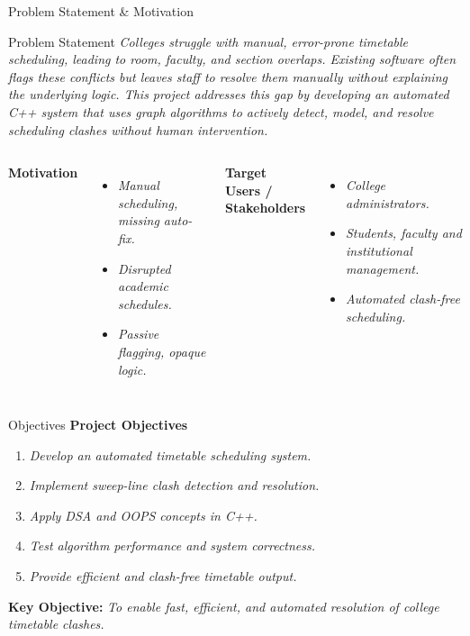 \documentclass[aspectratio=169,11pt]{beamer}
\newcommand{\placeholder}[1]{\textit{\color{GEUGrey}#1}}
\begin{document}
\begin{frame}{Problem Statement \& Motivation}
\begin{block}{Problem Statement}
\placeholder{Colleges struggle with manual, error-prone timetable scheduling, leading to room, faculty, and section overlaps. Existing software often flags these conflicts but leaves staff to resolve them manually without explaining the underlying logic. This project addresses this gap by developing an automated C++ system that uses graph algorithms to actively detect, model, and resolve scheduling clashes without human intervention.}
\end{block}
\vspace{2mm}
\begin{columns}[T,totalwidth=\textwidth]
\textbf{\color{GEUBlue}Motivation}
\begin{itemize}\itemsep2pt
\item \placeholder{Manual scheduling, missing auto-fix.}
\item \placeholder{Disrupted academic schedules.}
\item \placeholder{Passive flagging, opaque logic.}
\end{itemize}
\textbf{\color{GEUBlue}Target Users / Stakeholders}
\begin{itemize}\itemsep2pt
\item \placeholder{College administrators.}
\item \placeholder{Students, faculty and institutional management.}
\item \placeholder{Automated clash-free scheduling.}
\end{itemize}
\end{columns}
\end{frame}

\begin{frame}{Objectives}
\textbf{\color{GEUBlue}Project Objectives}
\vspace{2mm}
\begin{enumerate}\itemsep5pt
\item \placeholder{Develop an automated timetable scheduling system.}
\item \placeholder{Implement sweep-line clash detection and resolution.}
\item \placeholder{Apply DSA and OOPS concepts in C++.}
\item \placeholder{Test algorithm performance and system correctness.}
\item \placeholder{Provide efficient and clash-free timetable output.}
\end{enumerate}
\vfill
\begin{center}
\colorbox{GEULightBlue}{\parbox{.80\textwidth}{\centering
\textbf{Key Objective:} \placeholder{To enable fast, efficient, and automated resolution of college timetable clashes.}}}
\end{center}
\end{frame}
\end{document}
